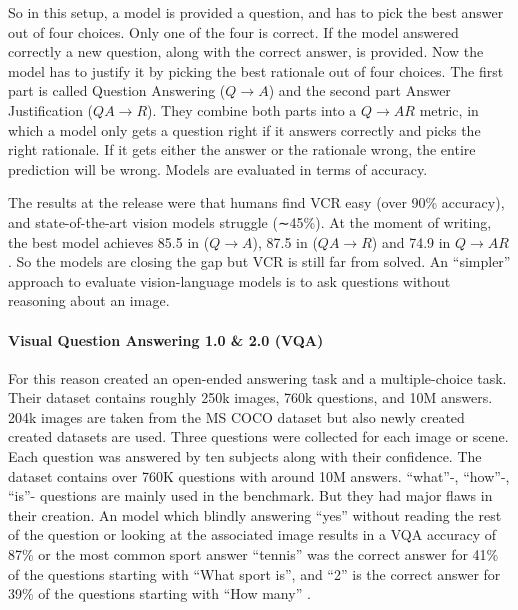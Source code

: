 \documentclass[
]{krantz}
\begin{document}
So in this setup, a model is provided a question, and has to pick the best answer out of four choices. Only one of the four is correct. If the model answered correctly a new question, along with the correct answer, is provided. Now the model has to justify it by picking the best rationale out of four choices. The first part is called Question Answering (\(Q\rightarrow A\)) and the second part Answer Justification (\(QA\rightarrow R\)). They combine both parts into a \(Q\rightarrow AR\) metric, in which a model only gets a question right if it answers correctly and picks the right rationale. If it gets either the answer or the rationale wrong, the entire prediction will be wrong. Models are evaluated in terms of accuracy.

The results at the release were that humans find VCR easy (over 90\% accuracy), and state-of-the-art vision models struggle (∼45\%). At the moment of writing, the best model achieves 85.5 in (\(Q\rightarrow A\)), 87.5 in (\(QA\rightarrow R\)) and 74.9 in \(Q\rightarrow AR\). So the models are closing the gap but VCR is still far from solved. An ``simpler'' approach to evaluate vision-language models is to ask questions without reasoning about an image.

\hypertarget{visual-question-answering-1.0-2.0-vqa}{%
\paragraph{Visual Question Answering 1.0 \& 2.0 (VQA)}\label{visual-question-answering-1.0-2.0-vqa}}

For this reason \citet{antol2015vqa} created an open-ended answering task and a multiple-choice task. Their dataset contains roughly 250k images, 760k questions, and 10M answers. 204k images are taken from the MS COCO dataset but also newly created created datasets are used. Three questions were collected for each image or scene. Each question was answered by ten subjects along with their confidence. The dataset contains over 760K questions with around 10M answers. ``what''-, ``how''-, ``is''- questions are mainly used in the benchmark. But they had major flaws in their creation. An model which blindly answering ``yes'' without reading the rest of the question or looking at the associated image results in a VQA accuracy of 87\% or the most common sport answer ``tennis'' was the correct answer for 41\% of the questions starting with ``What sport is'', and ``2'' is the correct answer for 39\% of the questions starting with ``How many'' \citep{antol2015vqa}.
\end{document}
